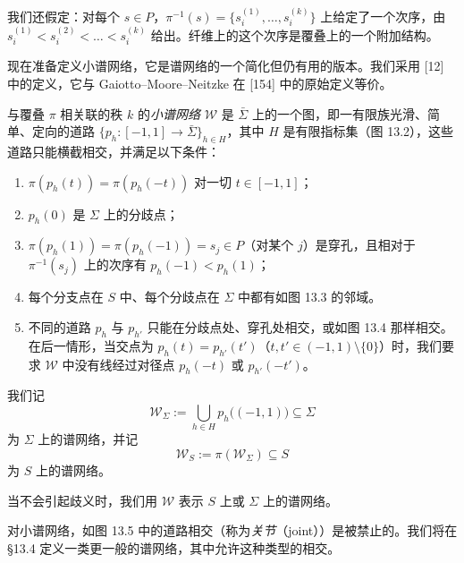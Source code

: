 我们还假定：对每个 $s\in P$，$\pi^{-1}(s)=\{s_i^{(1)},\dots,s_i^{(k)}\}$ 上给定了一个次序，由 $s_i^{(1)}<s_i^{(2)}<\dots<s_i^{(k)}$ 给出。纤维上的这个次序是覆叠上的一个附加结构。

现在准备定义小谱网络，它是谱网络的一个简化但仍有用的版本。我们采用 [12] 中的定义，它与 Gaiotto--Moore--Neitzke 在 [154] 中的原始定义等价。

\begin{definition}[13.7]
与覆叠 $\pi$ 相关联的秩 $k$ 的\emph{小谱网络} $\mathcal{W}$ 是 $\bar\Sigma$ 上的一个图，即一有限族光滑、简单、定向的道路 $\{p_h\colon[-1,1]\to\bar\Sigma\}_{h\in H}$，其中 $H$ 是有限指标集（图 13.2），这些道路只能横截相交，并满足以下条件：
\begin{enumerate}
\item $\pi(p_h(t))=\pi(p_h(-t))$ 对一切 $t\in[-1,1]$；
\item $p_h(0)$ 是 $\Sigma$ 上的分歧点；
\item $\pi(p_h(1))=\pi(p_h(-1))=s_j\in P$（对某个 $j$）是穿孔，且相对于 $\pi^{-1}(s_j)$ 上的次序有 $p_h(-1)<p_h(1)$；
\item 每个分支点在 $S$ 中、每个分歧点在 $\Sigma$ 中都有如图 13.3 的邻域。
\item 不同的道路 $p_h$ 与 $p_{h'}$ 只能在分歧点处、穿孔处相交，或如图 13.4 那样相交。在后一情形，当交点为 $p_h(t)=p_{h'}(t')$（$t,t'\in(-1,1)\setminus\{0\}$）时，我们要求 $\mathcal{W}$ 中没有线经过对径点 $p_h(-t)$ 或 $p_{h'}(-t')$。
\end{enumerate}
\end{definition}




我们记
\[
\mathcal{W}_\Sigma:=\bigcup_{h\in H}p_h\bigl((-1,1)\bigr)\subseteq\Sigma
\]
为 $\Sigma$ 上的谱网络，并记
\[
\mathcal{W}_S:=\pi(\mathcal{W}_\Sigma)\subseteq S
\]
为 $S$ 上的谱网络。

\begin{remark}[13.8]
当不会引起歧义时，我们用 $\mathcal{W}$ 表示 $S$ 上或 $\Sigma$ 上的谱网络。
\end{remark}

\begin{remark}[13.9]
对小谱网络，如图 13.5 中的道路相交（称为\emph{关节}（joint））是被禁止的。我们将在 §13.4 定义一类更一般的谱网络，其中允许这种类型的相交。
\end{remark}

